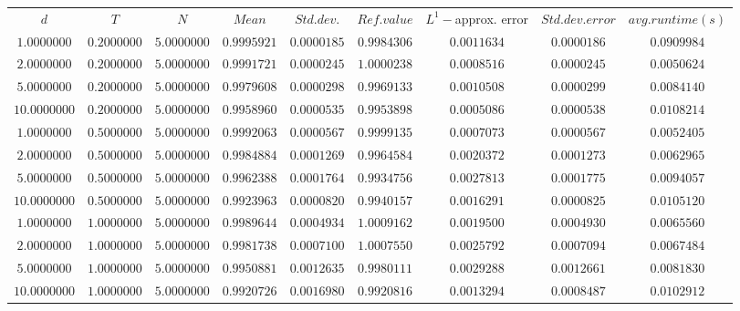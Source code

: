 \begin{tabular}{ccccccccc}
$d$ & $T$ & $N$ & $Mean$ & $Std. dev.$ & $Ref. value$ & $L^1-$approx. error & $Std. dev. error$ & $avg. runtime (s)$\\
$1.0000000$ & $0.2000000$ & $5.0000000$ & $0.9995921$ & $0.0000185$ & $0.9984306$ & $0.0011634$ & $0.0000186$ & $0.0909984$\\
$2.0000000$ & $0.2000000$ & $5.0000000$ & $0.9991721$ & $0.0000245$ & $1.0000238$ & $0.0008516$ & $0.0000245$ & $0.0050624$\\
$5.0000000$ & $0.2000000$ & $5.0000000$ & $0.9979608$ & $0.0000298$ & $0.9969133$ & $0.0010508$ & $0.0000299$ & $0.0084140$\\
$10.0000000$ & $0.2000000$ & $5.0000000$ & $0.9958960$ & $0.0000535$ & $0.9953898$ & $0.0005086$ & $0.0000538$ & $0.0108214$\\
$1.0000000$ & $0.5000000$ & $5.0000000$ & $0.9992063$ & $0.0000567$ & $0.9999135$ & $0.0007073$ & $0.0000567$ & $0.0052405$\\
$2.0000000$ & $0.5000000$ & $5.0000000$ & $0.9984884$ & $0.0001269$ & $0.9964584$ & $0.0020372$ & $0.0001273$ & $0.0062965$\\
$5.0000000$ & $0.5000000$ & $5.0000000$ & $0.9962388$ & $0.0001764$ & $0.9934756$ & $0.0027813$ & $0.0001775$ & $0.0094057$\\
$10.0000000$ & $0.5000000$ & $5.0000000$ & $0.9923963$ & $0.0000820$ & $0.9940157$ & $0.0016291$ & $0.0000825$ & $0.0105120$\\
$1.0000000$ & $1.0000000$ & $5.0000000$ & $0.9989644$ & $0.0004934$ & $1.0009162$ & $0.0019500$ & $0.0004930$ & $0.0065560$\\
$2.0000000$ & $1.0000000$ & $5.0000000$ & $0.9981738$ & $0.0007100$ & $1.0007550$ & $0.0025792$ & $0.0007094$ & $0.0067484$\\
$5.0000000$ & $1.0000000$ & $5.0000000$ & $0.9950881$ & $0.0012635$ & $0.9980111$ & $0.0029288$ & $0.0012661$ & $0.0081830$\\
$10.0000000$ & $1.0000000$ & $5.0000000$ & $0.9920726$ & $0.0016980$ & $0.9920816$ & $0.0013294$ & $0.0008487$ & $0.0102912$\\
\end{tabular}
